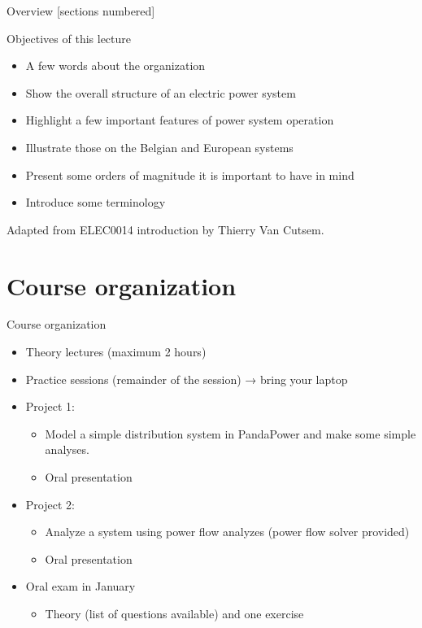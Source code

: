 \titleframe





\begin{frame}{Overview}
  [sections numbered]
  \tableofcontents[hideallsubsections]
\end{frame}




\begin{frame} {Objectives of this lecture}
\begin{itemize}
\item A few words about the organization
\item Show the overall structure of an electric power system
\item Highlight a few important features of power system operation
\item Illustrate those on the Belgian and European systems
\item Present some orders of magnitude it is important to have in mind
\item Introduce some terminology
\end{itemize}
\vfill
\small{Adapted from ELEC0014 introduction by Thierry Van Cutsem.}
\end{frame}

\section{Course organization}


\begin{frame}
{Course organization}
\begin{itemize}
\item Theory lectures (maximum 2 hours)
\item Practice sessions (remainder of the session) → bring your laptop
\item Project 1:
\begin{itemize}
\item Model a simple distribution system in PandaPower and make some simple analyses.
\item Oral presentation
\end{itemize}
\item Project 2:
\begin{itemize}
\item Analyze a system using power flow analyzes (power flow solver provided)
\item Oral presentation
\end{itemize}
\item Oral exam in January
\begin{itemize}
\item Theory (list of questions available) and one exercise
\end{itemize}
\end{itemize}
\end{frame}

